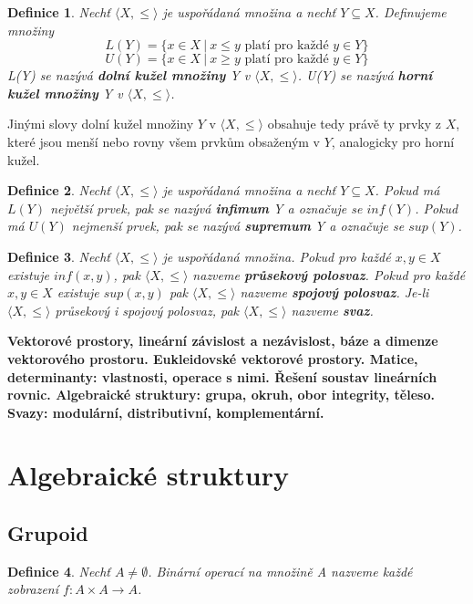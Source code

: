 \documentclass[12pt,a4paper]{article}
\newtheorem{definition}{Definice}
\begin{document}
\begin{definition}
	Nechť $\langle X, \leq \rangle$ je uspořádaná množina a nechť $Y \subseteq X$. Definujeme množiny
	$$L(Y) = \{ x \in X \ | \ x \leq y \text{ platí pro každé } y \in Y\}$$
	$$U(Y) =  \{ x \in X \ | \ x \geq y \text{ platí pro každé } y \in Y\}$$
	L(Y) se nazývá \textbf{dolní kužel množiny} Y v  $\langle X, \leq \rangle$. U(Y) se nazývá \textbf{horní kužel množiny} Y v  $\langle X, \leq \rangle$.
\end{definition}

Jinými slovy dolní kužel množiny $Y$ v  $\langle X, \leq \rangle$ obsahuje tedy právě ty prvky z $X$, které jsou menší nebo rovny všem prvkům obsaženým v $Y$, analogicky pro horní kužel.

\begin{definition}
	Nechť  $\langle X, \leq \rangle$ je uspořádaná množina a nechť $Y \subseteq X$. Pokud má $L(Y)$ největší prvek, pak se nazývá \textbf{infimum} Y a označuje se $inf(Y)$. Pokud má $U(Y)$ nejmenší prvek, pak se nazývá \textbf{supremum} Y a označuje se $sup(Y)$.
\end{definition}

\begin{definition}
	Nechť  $\langle X, \leq \rangle$ je uspořádaná množina. Pokud pro každé $x,y \in X$ existuje $inf(x,y)$, pak  $\langle X, \leq \rangle$ nazveme \textbf{průsekový polosvaz}. Pokud pro každé $x,y \in X$ existuje $sup(x,y)$ pak  $\langle X, \leq \rangle$ nazveme \textbf{spojový polosvaz}. Je-li  $\langle X, \leq \rangle$ průsekový i spojový polosvaz, pak  $\langle X, \leq \rangle$ nazveme \textbf{svaz}.
\end{definition}

\newpage
\textbf{Vektorové prostory, lineární závislost a nezávislost, báze a dimenze vektorového prostoru. Eukleidovské vektorové
prostory. Matice, determinanty: vlastnosti, operace s nimi. Řešení soustav lineárních rovnic. Algebraické
struktury: grupa, okruh, obor integrity, těleso. Svazy: modulární, distributivní, komplementární.}

\section{Algebraické struktury}
\subsection{Grupoid}
\begin{definition}
	Nechť $A \not= \emptyset$. Binární operací na množině A nazveme každé zobrazení $f : A \times A \rightarrow A$.
\end{definition}
\end{document}
